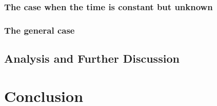 \documentclass{article}
\theoremstyle{plain}
\theoremstyle{definition}
\theoremstyle{remark}
\begin{document}
    \subsubsection{The case when the time is constant but unknown}

    \subsubsection{The general case}

    \subsection{Analysis and Further Discussion}

    \section{Conclusion}

    \newpage
    
    

    
    
\end{document}
